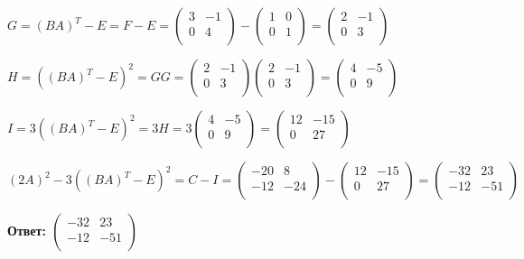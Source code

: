 \documentclass[a4paper,12pt]{article}
\begin{document}
\begin{enumerate}
$G=(BA)^T - E=F-E=\begin{pmatrix}
3 & -1\\
0 & 4\\
\end{pmatrix}-\begin{pmatrix}
1 & 0\\
0 & 1\\
\end{pmatrix}=\begin{pmatrix}
2 & -1\\
0 & 3\\
\end{pmatrix}$

$H=((BA)^T - E)^2=GG=\begin{pmatrix}
2 & -1\\
0 & 3\\
\end{pmatrix}\begin{pmatrix}
2 & -1\\
0 & 3\\
\end{pmatrix}=\begin{pmatrix}
4 & -5\\
0 & 9\\
\end{pmatrix}$

$I=3((BA)^T - E)^2=3H=3\begin{pmatrix}
4 & -5\\
0 & 9\\
\end{pmatrix}=\begin{pmatrix}
12 & -15\\
0 & 27\\
\end{pmatrix} $

$(2A)^2 - 3((BA)^T - E)^2=C-I=\begin{pmatrix}
-20 & 8\\
-12 & -24\\
\end{pmatrix}-\begin{pmatrix}
12 & -15\\
0 & 27\\
\end{pmatrix} =\begin{pmatrix}
-32 & 23\\
-12 & -51\\
\end{pmatrix} $


\textbf{Ответ: $\begin{pmatrix}
-32 & 23\\
-12 & -51\\
\end{pmatrix}$}



\end{enumerate}
\end{document}
